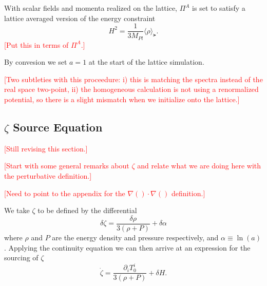 With scalar fields and momenta realized on the lattice, $\Pi^A$ is set to satisfy a lattice averaged version of the energy constraint
\begin{equation} \label{eq:energy constraint}
  H^2 = \frac{1}{3M_{Pl}}\langle \rho \rangle_\lat.
\end{equation}
\textcolor{red}{[Put this in terms of $\Pi^A$.]}

By convesion we set $a=1$ at the start of the lattice simulation.

\textcolor{red}{[Two subtleties with this proceedure: i) this is matching the spectra instead of the real space two-point, ii) the homogeneous calculation is not using a renormalized potential, so there is a slight mismatch when we initialize onto the lattice.]}

\subsection{$\zeta$ Source Equation} \label{sec:zeta source}
\textcolor{red}{[Still revising this section.]}

\textcolor{red}{[Start with some general remarks about $\zeta$ and relate what we are doing here with the perturbative definition.]}

\textcolor{red}{[Need to point to the appendix for the $\nabla()\cdot\nabla()$ definition.]}

We take $\zeta$ to be defined by the differential
\begin{equation} \label{eq:zeta differential}
  \delta\zeta = \frac{\delta\rho}{3(\rho + P)} + \delta\alpha
\end{equation} 
where $\rho$ and $P$ are the energy density and pressure respectively, and $\alpha \equiv \ln(a)$.
Applying the continuity equation we can then arrive at an expression for the sourcing of $\zeta$
\begin{equation} \label{eq:zeta source T}
  \dot{\zeta} = \frac{\partial_iT^i_0}{3(\rho+P)} + \delta H. %
\end{equation}

